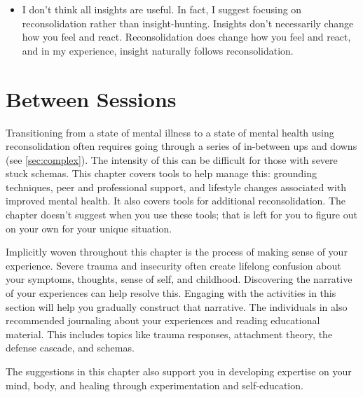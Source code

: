 \documentclass[11pt,oneside]{book}
\begin{document}
\begin{itemize}
    First, I discovered an internal source of inviolable safety that I later used as a universal stuck schema contradiction in reconsolidation exercises (see \cref{internalizedReports}).

    Second, the inviolable safety also functioned as a baseline to compare all other experiences to. That made it much easier to tell when I had an active stuck schema in daily life, even if I didn't know what the schema is.

    Third, the experience helped them realize that most people hurt each other because they are acting on the stuck schemas they learned when they were hurt.
    \item I don't think all insights are useful. In fact, I suggest focusing on reconsolidation rather than insight-hunting. Insights don't necessarily change how you feel and react. Reconsolidation does change how you feel and react, and in my experience, insight naturally follows reconsolidation.
\end{itemize}

\chapter{Between Sessions}
\label{sectionManagement}
Transitioning from a state of mental illness to a state of mental health using reconsolidation often requires going through a series of in-between ups and downs (see \cref{sec:complex}). The intensity of this can be difficult for those with severe stuck schemas. This chapter covers tools to help manage this: grounding techniques, peer and professional support, and lifestyle changes associated with improved mental health. It also covers tools for additional reconsolidation. The chapter doesn't suggest when you use these tools; that is left for you to figure out on your own for your unique situation.

Implicitly woven throughout this chapter is the process of making sense of your experience. Severe trauma and insecurity often create lifelong confusion about your symptoms, thoughts, sense of self, and childhood. Discovering the narrative of your experiences can help resolve this. Engaging with the activities in this section will help you gradually construct that narrative. The individuals in \textcite{robinson2024coming} also recommended journaling about your experiences and reading educational material. This includes topics like trauma responses, attachment theory, the defense cascade, and schemas.

The suggestions in this chapter also support you in developing expertise on your mind, body, and healing through experimentation and self-education.
\end{document}
